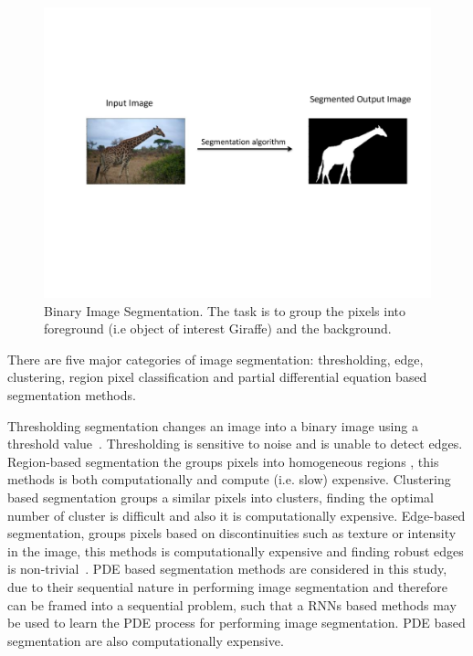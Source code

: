 \documentclass{WitsPhysicsReport}
\begin{document}
\begin{figure}[H]
\centering
  \includegraphics[width=\linewidth]{./Figure/segmentation.pdf}
\caption{Binary Image Segmentation. The task is to group the pixels into foreground (i.e object of interest Giraffe) and the background.}
\label{fig:binary_image_segmenatation}
\end{figure}

There are five major categories of image segmentation: thresholding, edge, clustering, region pixel classification and partial differential equation based segmentation methods.

Thresholding segmentation changes an image into a binary image using a threshold value~\cite{bali2015review,khan2014survey}. Thresholding is sensitive to noise and is unable to detect edges. Region-based segmentation the groups pixels into homogeneous regions , this methods is both computationally and compute (i.e. slow) expensive. Clustering based segmentation groups a similar pixels into clusters, finding the optimal number of cluster is difficult and also it is computationally expensive. Edge-based segmentation, groups pixels based on discontinuities such as texture or intensity in the image, this methods is computationally expensive and finding robust edges is non-trivial~\cite{upadhyay2017survey}. PDE based segmentation methods are considered in this study, due to their sequential nature in performing image segmentation and therefore can be framed into a sequential problem, such that a RNNs based methods may be used to learn the PDE process for performing image segmentation. PDE based segmentation are also computationally expensive.
\end{document}
